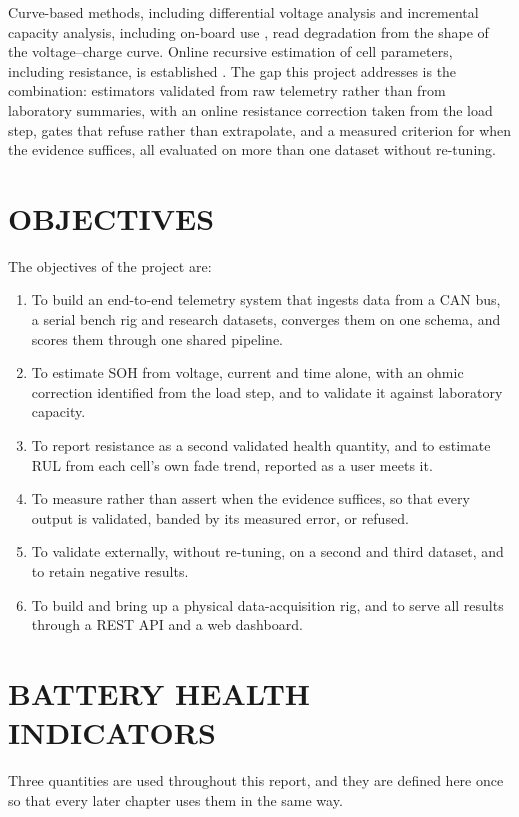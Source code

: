 Curve-based methods, including differential voltage analysis \cite{bloom2005} and incremental capacity analysis, including on-board use \cite{weng2013}, read degradation from the shape of the voltage--charge curve. Online recursive estimation of cell parameters, including resistance, is established \cite{plett2004}. The gap this project addresses is the combination: estimators validated from raw telemetry rather than from laboratory summaries, with an online resistance correction taken from the load step, gates that refuse rather than extrapolate, and a measured criterion for when the evidence suffices, all evaluated on more than one dataset without re-tuning.

\section{OBJECTIVES}

The objectives of the project are:

\begin{enumerate}
    \item To build an end-to-end telemetry system that ingests data from a CAN bus, a serial bench rig and research datasets, converges them on one schema, and scores them through one shared pipeline.
    \item To estimate SOH from voltage, current and time alone, with an ohmic correction identified from the load step, and to validate it against laboratory capacity.
    \item To report resistance as a second validated health quantity, and to estimate RUL from each cell's own fade trend, reported as a user meets it.
    \item To measure rather than assert when the evidence suffices, so that every output is validated, banded by its measured error, or refused.
    \item To validate externally, without re-tuning, on a second and third dataset, and to retain negative results.
    \item To build and bring up a physical data-acquisition rig, and to serve all results through a REST API and a web dashboard.
\end{enumerate}

\section{BATTERY HEALTH INDICATORS}

Three quantities are used throughout this report, and they are defined here once so that every later chapter uses them in the same way.

